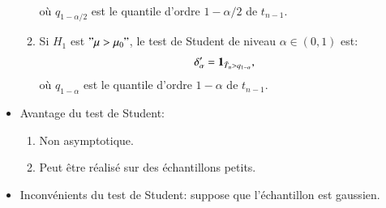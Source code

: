 \begin{frame}
\begin{itemize}
\begin{enumerate}[-]
\begin{align*}
            \end{align*}
            où $q_{1-\alpha / 2}$ est le quantile d'ordre $1-\alpha/2$ de $t_{n-1}$.
            \item  Si $H_1$ est $"\mu>\mu_0"$, le test de Student de niveau $\alpha\in(0,1)$ est:
            \begin{align*}
                \delta^\prime_\alpha = \mathbf{1}_{\tilde{T}_n > q_{1-\alpha}},
            \end{align*}
            où $q_{1-\alpha}$ est le quantile d'ordre $1-\alpha$ de $t_{n-1}$.
        \end{enumerate}
        \item Avantage du test de Student: 
        \begin{enumerate}[-]
            \item Non asymptotique.
            \item Peut être réalisé sur des échantillons petits.
        \end{enumerate}
        \item Inconvénients du test de Student: suppose que l'échantillon est gaussien.
    \end{itemize}
\end{frame}
